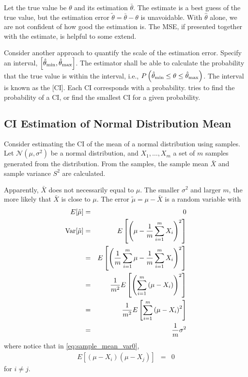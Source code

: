 Let the true value be $\theta$ and its estimation $\bar{\theta}$. The estimate is a best guess of the true value, but the estimation error $\tilde{\theta} = \bar{\theta} - \theta$ is unavoidable. With $\hat{\theta}$ alone, we are not confident of how good the estimation is. The MSE, if presented together with the estimate, is helpful to some extend.

Consider another approach to quantify the scale of the estimation error. Specify an interval, $\left[\hat{\theta}_{\textup{min}},\hat{\theta}_{\textup{max}}\right]$. The estimator shall be able to calculate the probability that the true value is within the interval, i.e., $P\left(\hat{\theta}_{\textup{min}} \leq \theta \leq \hat{\theta}_{\textup{max}}\right)$. The interval is known as the [CI]. Each CI corresponds with a probability.  tries to find the probability of a CI, or find the smallest CI for a given probability.

\subsection{CI Estimation of Normal Distribution Mean}

Consider estimating the CI of the mean of a normal distribution using samples. Let $\mathcal{N}(\mu,\sigma^2)$ be a normal distribution, and $X_1, \ldots, X_m$ a set of $m$ samples generated from the distribution. From the samples, the sample mean $\bar{X}$ and sample variance $S^2$ are calculated.

Apparently, $\bar{X}$ does not necessarily equal to $\mu$. The smaller $\sigma^2$ and larger $m$, the more likely that $\bar{X}$ is close to $\mu$. The error $\tilde{\mu} = \mu - \bar{X}$ is a random variable with
\begin{eqnarray}
	E[\tilde{\mu}] &=& 0 \nonumber \\
	\textup{Var}[\tilde{\mu}] &=& E\left[\left(\mu-\dfrac{1}{m}\sum_{i=1}^{m} X_i\right)^2\right] \nonumber \\
	&=& E\left[\left(\dfrac{1}{m}\sum_{i=1}^{m}\mu-\dfrac{1}{m}\sum_{i=1}^{m} X_i\right)^2\right] \nonumber \\
	&=& \dfrac{1}{m^2}E\left[\left(\sum_{i=1}^{m}\left(\mu-X_i\right)\right)^2\right] \label{eq:sample_mean_var0} \\
	&=& \dfrac{1}{m^2}E\left[\sum_{i=1}^{m}\left(\mu-X_i\right)^2\right] \label{eq:sample_mean_var1} \\
	&=& \dfrac{1}{m}\sigma^2 \label{eq:sample_mean_var2}
\end{eqnarray}
where notice that in \eqref{eq:sample_mean_var0},
\begin{eqnarray}
	E\left[\left(\mu-X_i\right)\left(\mu-X_j\right)\right] &=& 0 \nonumber
\end{eqnarray}
for $i\neq j$.

